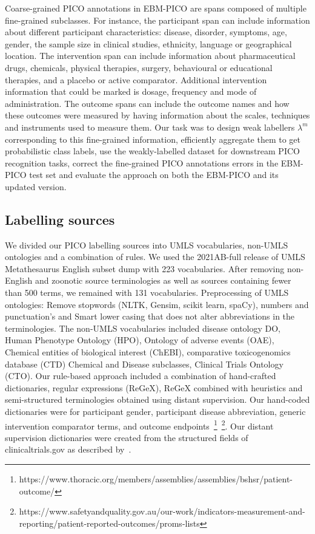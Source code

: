 \documentclass[10.7pt,]{article}
\begin{document}
Coarse-grained PICO annotations in EBM-PICO are spans composed of multiple fine-grained subclasses.
For instance, the participant span can include information about different participant characteristics: disease, disorder, symptoms, age, gender, the sample size in clinical studies, ethnicity, language or geographical location.
The intervention span can include information about pharmaceutical drugs, chemicals, physical therapies, surgery, behavioural or educational therapies, and a placebo or active comparator.
Additional intervention information that could be marked is dosage, frequency and mode of administration.
The outcome spans can include the outcome names and how these outcomes were measured by having information about the scales, techniques and instruments used to measure them.
Our task was to design weak labellers $\lambda^{m}$ corresponding to this fine-grained information, efficiently aggregate them to get probabilistic class labels, use the weakly-labelled dataset for downstream PICO recognition tasks, correct the fine-grained PICO annotations errors in the EBM-PICO test set and evaluate the approach on both the EBM-PICO and its updated version.

%
%
%
\subsection{Labelling sources}\label{lss}
%
We divided our PICO labelling sources into UMLS vocabularies, non-UMLS ontologies and a combination of rules.
We used the 2021AB-full release of UMLS Metathesaurus English subset dump with 223 vocabularies.
After removing non-English and zoonotic source terminologies as well as sources containing fewer than 500 terms, we remained with 131 vocabularies.
Preprocessing of UMLS ontologies: Remove stopwords (NLTK, Gensim, scikit learn, spaCy), numbers and punctuation's and Smart lower casing that does not alter abbreviations in the terminologies.
The non-UMLS vocabularies included disease ontology DO, Human Phenotype Ontology (HPO), Ontology of adverse events (OAE), Chemical entities of biological interest (ChEBI),  comparative toxicogenomics database (CTD) Chemical and Disease subclasses, Clinical Trials Ontology (CTO).
Our rule-based approach included a combination of hand-crafted dictionaries, regular expressions (ReGeX), ReGeX combined with heuristics and semi-structured terminologies obtained using distant supervision. 
Our hand-coded dictionaries were for participant gender, participant disease abbreviation, generic intervention comparator terms, and outcome endpoints~\footnote{https://www.thoracic.org/members/assemblies/assemblies/bshsr/patient-outcome/}~\footnote{https://www.safetyandquality.gov.au/our-work/indicators-measurement-and-reporting/patient-reported-outcomes/proms-lists}.
Our distant supervision dictionaries were created from the structured fields of clinicaltrials.gov as described by~\cite{dhrangadhariya2022distant}.
%
%
%
\end{document}

